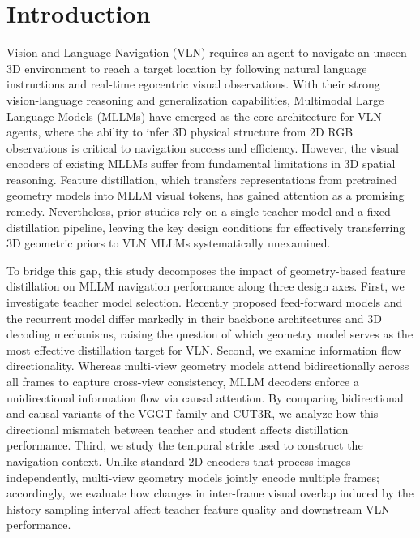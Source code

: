 \chapter{Introduction}
\label{ch:introduction}

Vision-and-Language Navigation (VLN) requires an agent to navigate an unseen 3D environment to reach a target location by following natural language instructions and real-time egocentric visual observations. With their strong vision-language reasoning and generalization capabilities, Multimodal Large Language Models (MLLMs) have emerged as the core architecture for VLN agents, where the ability to infer 3D physical structure from 2D RGB observations is critical to navigation success and efficiency. However, the visual encoders of existing MLLMs suffer from fundamental limitations in 3D spatial reasoning. Feature distillation, which transfers representations from pretrained geometry models into MLLM visual tokens, has gained attention as a promising remedy. Nevertheless, prior studies rely on a single teacher model and a fixed distillation pipeline, leaving the key design conditions for effectively transferring 3D geometric priors to VLN MLLMs systematically unexamined.

To bridge this gap, this study decomposes the impact of geometry-based feature distillation on MLLM navigation performance along three design axes. First, we investigate teacher model selection. Recently proposed feed-forward models and the recurrent model differ markedly in their backbone architectures and 3D decoding mechanisms, raising the question of which geometry model serves as the most effective distillation target for VLN. Second, we examine information flow directionality. Whereas multi-view geometry models attend bidirectionally across all frames to capture cross-view consistency, MLLM decoders enforce a unidirectional information flow via causal attention. By comparing bidirectional and causal variants of the VGGT family and CUT3R, we analyze how this directional mismatch between teacher and student affects distillation performance. Third, we study the temporal stride used to construct the navigation context. Unlike standard 2D encoders that process images independently, multi-view geometry models jointly encode multiple frames; accordingly, we evaluate how changes in inter-frame visual overlap induced by the history sampling interval affect teacher feature quality and downstream VLN performance.

